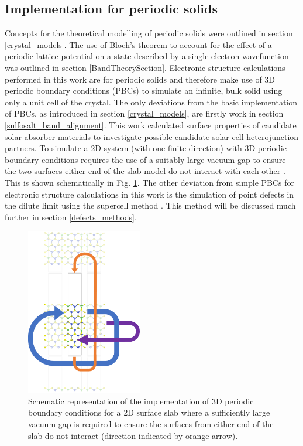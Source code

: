 \documentclass[11pt, twoside]{report}
\begin{document}


\subsection{Implementation for periodic solids}

Concepts for the theoretical modelling of periodic solids were outlined in section \ref{crystal_models}. The use of Bloch's theorem to account for the effect of a periodic lattice potential on a state described by a single-electron wavefunction was outlined in section \ref{BandTheorySection}. Electronic structure calculations performed in this work are for periodic solids and therefore make use of 3D periodic boundary conditions (PBCs) to simulate an infinite, bulk solid using only a unit cell of the crystal. The only deviations from the basic implementation of PBCs, as introduced in section \ref{crystal_models}, are firstly work in section \ref{sulfosalt_band_alignment}. This work calculated surface properties of candidate solar absorber materials to investigate possible candidate solar cell heterojunction partners. To simulate a 2D system (with one finite direction) with 3D periodic boundary conditions requires the use of a suitably large vacuum gap to ensure the two surfaces either end of the slab model do not interact with each other \cite{Prasad_ch6}. This is shown schematically in Fig. \ref{slab_PBCs}. The other deviation from simple PBCs for electronic structure calculations in this work is the simulation of point defects in the dilute limit using the supercell method \cite{SupercellMethodDefects}. This method will be discussed much further in section \ref{defects_methods}. 

\begin{figure}[h!]
  \centering
    \includegraphics[width=0.45\textwidth]{figures/slab_PBCs.png}
    \caption{Schematic representation of the implementation of 3D periodic boundary conditions for a 2D surface slab where a sufficiently large vacuum gap is required to ensure the surfaces from either end of the slab do not interact (direction indicated by orange arrow).}
  \label{slab_PBCs}
\end{figure}
\end{document}
